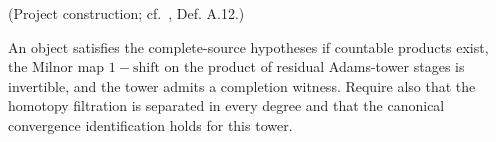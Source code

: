 \begin{definition}
\label{sem:Literature:bhs-applicability}
(Project construction; cf.\ \cite{BHS}, Def. A.12.)\par{}

An object satisfies the complete-source hypotheses if countable products exist, the Milnor map $1-\mathrm{shift}$ on the product of residual Adams-tower stages is invertible, and the tower admits a completion witness. Require also that the homotopy filtration is separated in every degree and that the canonical convergence identification holds for this tower.
\end{definition}

